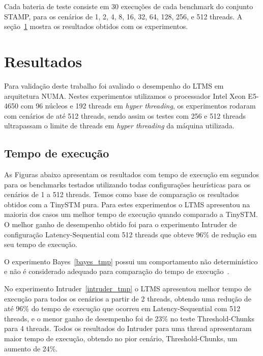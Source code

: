 \documentclass[diss,capa]{texufpel}
\begin{document}
Cada bateria de teste consiste em 30 execuções de cada benchmark do conjunto STAMP, para os cenários de 1, 2, 4, 8, 16, 32, 64, 128, 256, e 512 threads. A seção~\ref{resultados} mostra os resultados obtidos com os experimentos.

\section{Resultados}
\label{resultados}

Para validação deste trabalho foi avaliado o desempenho do LTMS em arquitetura NUMA.  Nestes experimentos utilizamos o processador Intel Xeon E5-4650 com 96 núcleos e 192 threads em \emph{hyper threading}, os experimentos rodaram com cenários de até 512 threads, sendo assim os testes com 256 e 512 threads ultrapassam o limite de threads em \emph{hyper threading} da máquina utilizada.

\subsection{Tempo de execução}

As Figuras abaixo apresentam os resultados com tempo de execução em segundos para os benchmarks testados utilizando todas configurações heurísticas para os cenários de 1 a 512 threads. Temos como base de comparação os resultados obtidos com a TinySTM pura. Para estes experimentos o LTMS apresentou na maioria dos casos um melhor tempo de execução quando comparado a TinySTM. O melhor ganho de desempenho obtido foi para o experimento Intruder de configuração Latency-Sequential com 512 threads que obteve 96\% de redução em seu tempo de execução.

O experimento Bayes~\ref{bayes_tmp} possui um comportamento não determinístico e não é considerado adequado para comparação do tempo de execução~\cite{Ruan:2014}.




No experimento Intruder~\ref{intruder_tmp} o LTMS apresentou melhor tempo de execução para todos os cenários a partir de 2 threads, obtendo uma redução de até 96\% do tempo de execução que ocorreu em Latency-Sequential com 512 threads, e o menor ganho de desempenho foi de 23\% no teste Threshold-Chunks para 4 threads. Todos os resultados do Intruder para uma thread apresentaram maior tempo de execução, obtendo no pior cenário, Threshold-Chunks, um aumento de 24\%.
\end{document}
